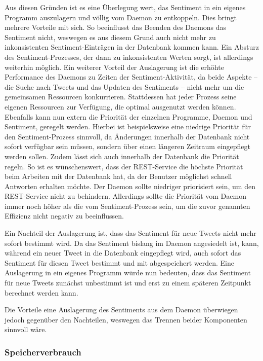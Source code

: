 Aus diesen Gründen ist es eine Überlegung wert, das Sentiment in ein eigenes Programm auszulagern und völlig vom Daemon zu entkoppeln.
Dies bringt mehrere Vorteile mit sich.
So beeinflusst das Beenden des Daemons das Sentiment nicht, weswegen es aus diesem Grund auch nicht mehr zu inkonsistenten Sentiment-Einträgen in der Datenbank kommen kann.
Ein Absturz des Sentiment-Prozesses, der dann zu inkonsistenten Werten sorgt, ist allerdings weiterhin möglich.
Ein weiterer Vorteil der Auslagerung ist die erhöhte Performance des Daemons zu Zeiten der Sentiment-Aktivität, da beide Aspekte -- die Suche nach Tweets und das Updaten des Sentiments -- nicht mehr um die gemeinsamen Ressourcen konkurrieren.
Stattdessen hat jeder Prozess seine eigenen Ressourcen zur Verfügung, die optimal ausgenutzt werden können.
Ebenfalls kann nun extern die Priorität der einzelnen Programme, Daemon und Sentiment, geregelt werden.
Hierbei ist beispielsweise eine niedrige Priorität für den Sentiment-Prozess sinnvoll, da Änderungen innerhalb der Datenbank nicht sofort verfügbar sein müssen, sondern über einen längeren Zeitraum eingepflegt werden sollen.
Zudem lässt sich auch innerhalb der Datenbank die Priorität regeln.
So ist es wünschenswert, dass der REST-Service die höchste Priorität beim Arbeiten mit der Datenbank hat, da der Benutzer möglichst schnell Antworten erhalten möchte.
Der Daemon sollte niedriger priorisiert sein, um den REST-Service nicht zu behindern.
Allerdings sollte die Priorität vom Daemon immer noch höher als die vom Sentiment-Prozess sein, um die zuvor genannten Effizienz nicht negativ zu beeinflussen.

Ein Nachteil der Auslagerung ist, dass das Sentiment für neue Tweets nicht mehr sofort bestimmt wird.
Da das Sentiment bislang im Daemon angesiedelt ist, kann, während ein neuer Tweet in die Datenbank eingepflegt wird, auch sofort das Sentiment für diesen Tweet bestimmt und mit abgespeichert werden.
Eine Auslagerung in ein eigenes Programm würde nun bedeuten, dass das Sentiment für neue Tweets zunächst unbestimmt ist und erst zu einem späteren Zeitpunkt berechnet werden kann.

Die Vorteile eine Auslagerung des Sentiments aus dem Daemon überwiegen jedoch gegenüber den Nachteilen, weswegen das Trennen beider Komponenten sinnvoll wäre.

\subsubsection{Speicherverbrauch}

